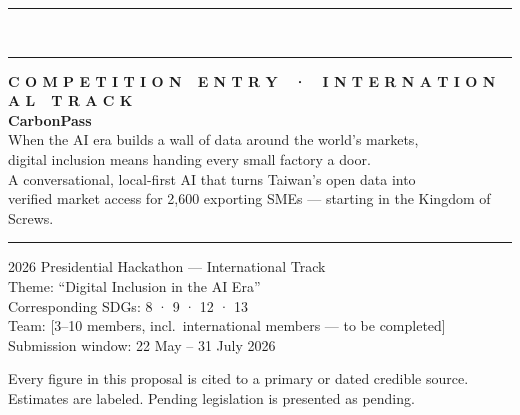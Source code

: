 \documentclass[11pt,a4paper]{article}
\begin{document}
\begin{titlepage}
\noindent
\begin{minipage}{\textwidth}
\vspace{0cm}
{\color{ink}\rule{\textwidth}{14mm}}\\[-2.5pt]
{\color{gold}\rule{\textwidth}{2.6mm}}
\end{minipage}

\vspace{2.4cm}
\begin{minipage}{0.85\textwidth}
\hspace{1.9cm}\begin{minipage}{0.9\textwidth}
{\sffamily\footnotesize\bfseries\color{gold}\MakeUppercase{C o m p e t i t i o n\ \ E n t r y\ \ ·\ \ I n t e r n a t i o n a l\ \ T r a c k}}\\[9mm]
{\fontsize{30}{34}\selectfont\bfseries\color{ink}CarbonPass}\\[6mm]
{\large\color{ink!80}When the AI era builds a wall of data around the world's markets,\\digital inclusion means handing every small factory a door.}\\[4mm]
{\normalsize\color{black!60}A conversational, local-first AI that turns Taiwan's open data into\\verified market access for 2,600 exporting SMEs --- starting in the Kingdom of Screws.}\\[12mm]
{\color{ink}\rule{2.6pt}{2.9cm}}\hspace{4mm}%
\begin{minipage}[b]{0.82\textwidth}\small
2026 Presidential Hackathon --- International Track\\
Theme: ``Digital Inclusion in the AI Era''\\
Corresponding SDGs: 8 · 9 · 12 · 13\\
Team: [3--10 members, incl.\ international members --- to be completed]\\
Submission window: 22 May -- 31 July 2026
\end{minipage}
\end{minipage}
\end{minipage}

\vfill
\noindent
\begin{minipage}{\textwidth}
\hspace{1.9cm}\begin{minipage}{0.52\textwidth}
\footnotesize\color{black!55}
Every figure in this proposal is cited to a primary or dated credible source.
Estimates are labeled. Pending legislation is presented as pending.
\end{minipage}
\hfill
\raisebox{-0.4cm}{{\color{gold!60}\rule{3cm}{3cm}}}\hspace{-3cm}\raisebox{-3.42cm}{{\color{ink}\rule{6.2cm}{3cm}}}
\end{minipage}
\restoregeometry
\end{titlepage}

\thispagestyle{plain}
\tableofcontents
\clearpage







\end{document}
